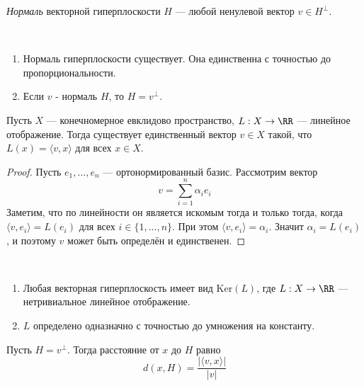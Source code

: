\documentclass[12pt,a4paper]{article}
\newcommand{\Ker}{\ensuremath{\mathrm{Ker}}\xspace}
\begin{document}
    \begin{definition}
        \emph{Нормаль} векторной гиперплоскости $H$ --- любой ненулевой вектор $v \in H^\perp$.
    \end{definition}

    \begin{lemma}\ 
        \begin{enumerate}
            \item Нормаль гиперплоскости существует. Она единственна с точностью до пропорциональности.
            \item Если $v$ - нормаль $H$, то $H = v^\perp$.
        \end{enumerate}
    \end{lemma}

    \begin{theorem}
        Пусть $X$ --- конечномерное евклидово пространство, $L: X \to \RR$ --- линейное отображение. Тогда существует единственный вектор $v \in X$ такой, что $L(x) = \langle v, x \rangle$ для всех $x \in X$.
    \end{theorem}

    \begin{proof}
        Пусть $e_1, \dots, e_n$ --- ортонормированный базис. Рассмотрим вектор
        \[v = \sum_{i=1}^n \alpha_i e_i\]
        Заметим, что по линейности он является искомым тогда и только тогда, когда $\langle v, e_i \rangle = L(e_i)$ для всех $i \in \{1, \dots, n\}$. При этом $\langle v, e_i \rangle = \alpha_i$. Значит $\alpha_i = L(e_i)$, и поэтому $v$ может быть определён и единственен.
    \end{proof}

    \begin{theorem}\ 
        \begin{enumerate}
            \item Любая векторная гиперплоскость имеет вид $\Ker(L)$, где $L: X \to \RR$ --- нетривиальное линейное отображение.
            \item $L$ определено одназначно с точностью до умножения на константу.
        \end{enumerate}
    \end{theorem}

    \begin{theorem}
        Пусть $H = v^\perp$. Тогда расстояние от $x$ до $H$ равно
        \[d(x, H) = \frac{|\langle v, x \rangle|}{|v|}\]
    \end{theorem}
\end{document}
